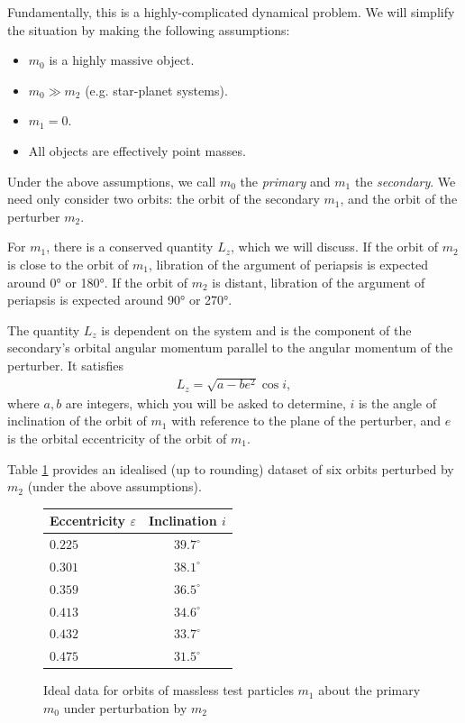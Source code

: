 \documentclass[a4paper,11pt]{exam}
\begin{document}
\begin{questions}
{Fundamentally, this is a highly-complicated dynamical problem. We will simplify the situation by making the following assumptions:
\begin{itemize}[leftmargin=10pt]
	\item $m_0$ is a highly massive object.
	\item $m_0 \gg m_2$ (e.g. star-planet systems).
	\item $m_1 = 0$.
	\item All objects are effectively point masses.
\end{itemize}

Under the above assumptions, we call $m_0$ the \textit{primary} and $m_1$ the \textit{secondary}. We need only consider two orbits: the orbit of the secondary $m_1$, and the orbit of the perturber $m_2$.

For $m_1$, there is a conserved quantity $L_z$, which we will discuss. If the orbit of $m_2$ is close to the orbit of $m_1$, libration of the argument of periapsis is expected around \ang{0} or \ang{180}. If the orbit of $m_2$ is distant, libration of the argument of periapsis is expected around \ang{90} or \ang{270}.

The quantity $L_z$ is dependent on the system and is the component of the secondary's orbital angular momentum parallel to the angular momentum of the perturber. It satisfies
\begin{align*}
L_z = \sqrt{a-be^2}\cos i,
\end{align*}
where $a,b$ are integers, which you will be asked to determine, $i$ is the angle of inclination of the orbit of $m_1$ with reference to the plane of the perturber, and $e$ is the orbital eccentricity of the orbit of $m_1$.

Table \ref{tbl8} provides an idealised (up to rounding) dataset of six orbits perturbed by $m_2$ (under the above assumptions).
\begin{figure}[H]
	\centering
	\begin{tabularx}{0.3\textwidth}{@{}lc@{}}
		\toprule \textbf{Eccentricity $\varepsilon$} & \textbf{Inclination $i$} \\ \midrule
				 $0.225$ & $39.7^\circ$\\
				 $0.301$ & $38.1^\circ$\\
				 $0.359$ & $36.5^\circ$\\
				 $0.413$ & $34.6^\circ$\\
				 $0.432$ & $33.7^\circ$\\
				 $0.475$ & $31.5^\circ$\\
		\bottomrule
	\end{tabularx}
	\renewcommand{\figurename}{Table}
	\caption{Ideal data for orbits of massless test particles $m_1$ about the primary $m_0$ under perturbation by $m_2$}
	\label{tbl8}
\end{figure}
}


\end{questions}
\end{document}
